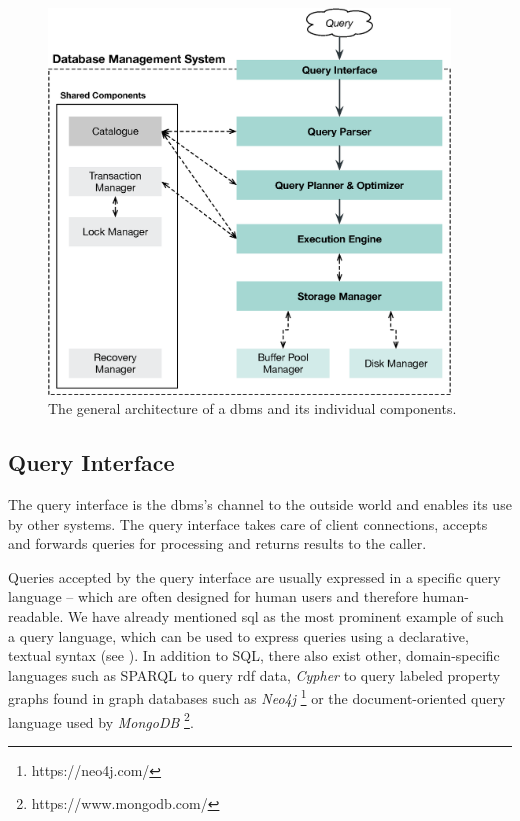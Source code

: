 \begin{figure}[tb]
    \centering
    \includegraphics[width=0.95\textwidth]{figures/dbms-architecture.eps}
    \caption{The general architecture of a \acrshort{dbms} and its individual components.}
    \label{figure:dbms-architecture}
\end{figure}

\subsection{Query Interface}

The query interface is the \acrshort{dbms}'s channel to the outside world and enables its use by other systems. The query interface takes care of client connections, accepts and forwards queries for processing and returns results to the caller.

Queries accepted by the query interface are usually expressed in a specific query language -- which are often designed for human users and therefore human-readable. We have already mentioned \acrshort{sql} \cite{Chamberlin:2012Early} as the most prominent example of such a query language, which can be used to express queries using a declarative, textual syntax (see ). In addition to SQL, there also exist other, domain-specific languages such as SPARQL \cite{Perez:2009Semantics} to query \acrfull{rdf} data, \emph{Cypher} to query labeled property graphs \cite{Francis:2018Cypher} found in graph databases such as \emph{Neo4j} \footnote{https://neo4j.com/} or the document-oriented query language used by \emph{MongoDB} \footnote{https://www.mongodb.com/}.

